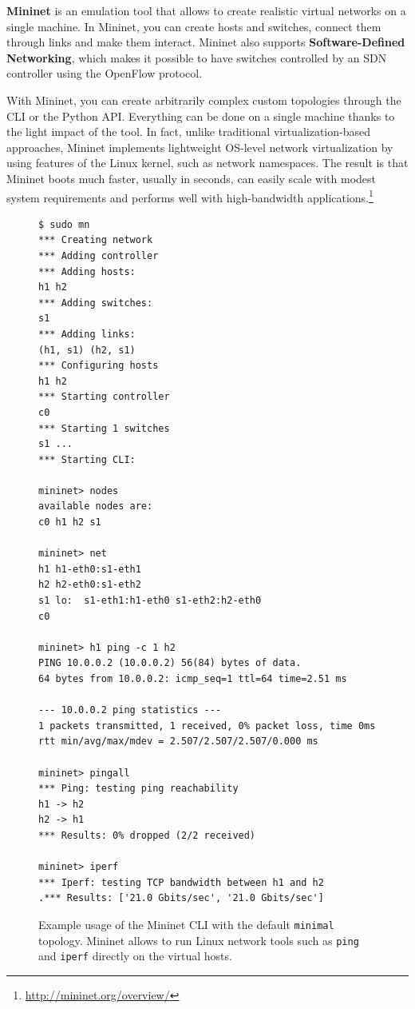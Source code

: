 \textbf{Mininet} is an emulation tool that allows to create realistic virtual networks on a single machine. In Mininet, you can create hosts and switches, connect them through links and make them interact. Mininet also supports \textbf{Software-Defined Networking}, which makes it possible to have switches controlled by an SDN controller using the OpenFlow protocol.

With Mininet, you can create arbitrarily complex custom topologies through the CLI or the Python API. Everything can be done on a single machine thanks to the light impact of the tool. In fact, unlike traditional virtualization-based approaches, Mininet implements lightweight OS-level network virtualization by using features of the Linux kernel, such as network namespaces. The result is that Mininet boots much faster, usually in seconds, can easily scale with modest system requirements and performs well with high-bandwidth applications.\footnote{\url{http://mininet.org/overview/}}

\begin{figure}[h]
    \centering
    \begin{verbatim}
$ sudo mn
*** Creating network
*** Adding controller
*** Adding hosts:
h1 h2
*** Adding switches:
s1
*** Adding links:
(h1, s1) (h2, s1)
*** Configuring hosts
h1 h2
*** Starting controller
c0
*** Starting 1 switches
s1 ...
*** Starting CLI:

mininet> nodes
available nodes are:
c0 h1 h2 s1

mininet> net
h1 h1-eth0:s1-eth1
h2 h2-eth0:s1-eth2
s1 lo:  s1-eth1:h1-eth0 s1-eth2:h2-eth0
c0

mininet> h1 ping -c 1 h2
PING 10.0.0.2 (10.0.0.2) 56(84) bytes of data.
64 bytes from 10.0.0.2: icmp_seq=1 ttl=64 time=2.51 ms

--- 10.0.0.2 ping statistics ---
1 packets transmitted, 1 received, 0% packet loss, time 0ms
rtt min/avg/max/mdev = 2.507/2.507/2.507/0.000 ms

mininet> pingall
*** Ping: testing ping reachability
h1 -> h2
h2 -> h1
*** Results: 0% dropped (2/2 received)

mininet> iperf
*** Iperf: testing TCP bandwidth between h1 and h2
.*** Results: ['21.0 Gbits/sec', '21.0 Gbits/sec']
    \end{verbatim}
    \caption{Example usage of the Mininet CLI with the default \texttt{minimal} topology. Mininet allows to run Linux network tools such as \texttt{ping} and \texttt{iperf} directly on the virtual hosts.}
    \label{fig:mininet}
\end{figure}

